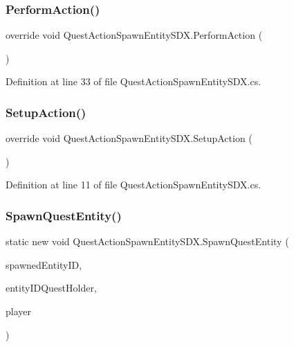 \mbox{\label{class_quest_action_spawn_entity_s_d_x_a06bb80d9e1e195fec2597394731df71f}} 
\subsubsection{\texorpdfstring{PerformAction()}{PerformAction()}}
{\footnotesize\ttfamily override void Quest\+Action\+Spawn\+Entity\+S\+D\+X.\+Perform\+Action (\begin{DoxyParamCaption}{ }\end{DoxyParamCaption})}



Definition at line 33 of file Quest\+Action\+Spawn\+Entity\+S\+D\+X.\+cs.

\mbox{\label{class_quest_action_spawn_entity_s_d_x_a6902fc3d884ca3eb9a19566a1db9ca6e}} 
\subsubsection{\texorpdfstring{SetupAction()}{SetupAction()}}
{\footnotesize\ttfamily override void Quest\+Action\+Spawn\+Entity\+S\+D\+X.\+Setup\+Action (\begin{DoxyParamCaption}{ }\end{DoxyParamCaption})}



Definition at line 11 of file Quest\+Action\+Spawn\+Entity\+S\+D\+X.\+cs.

\mbox{\label{class_quest_action_spawn_entity_s_d_x_a2957c925945eab011f79267d9dfe739f}} 
\subsubsection{\texorpdfstring{SpawnQuestEntity()}{SpawnQuestEntity()}}
{\footnotesize\ttfamily static new void Quest\+Action\+Spawn\+Entity\+S\+D\+X.\+Spawn\+Quest\+Entity (\begin{DoxyParamCaption}\item[{int}]{spawned\+Entity\+ID,  }\item[{int}]{entity\+I\+D\+Quest\+Holder,  }\item[{Entity\+Player}]{player }\end{DoxyParamCaption})\hspace{0.3cm}{\ttfamily [static]}}



